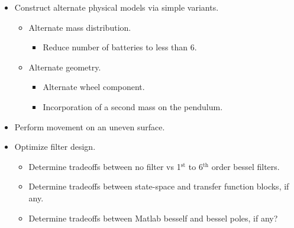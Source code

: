 \documentclass[crop=false,float=true,class=scrreprt]{standalone}
\begin{document}
\begin{itemize}[leftmargin=*]
\clearpage




\item Construct alternate physical models via simple variants.
\begin{itemize}[leftmargin=*, label=$\vcenter{\hbox{\tiny$\bullet$}}$]

  \item Alternate mass distribution.
  \begin{itemize}[leftmargin=*, label=$\cdot$]
  
    \item Reduce number of batteries to less than 6.
  
  \end{itemize}
  
  \item Alternate geometry.
  \begin{itemize}[leftmargin=*, label=$\cdot$]
  
    \item Alternate wheel component.\\
    
    \item Incorporation of a second mass on the pendulum.
  
  \end{itemize}
  
\end{itemize}


\item Perform movement on an uneven surface.


\item Optimize filter design.
\begin{itemize}[leftmargin=*, label=$\vcenter{\hbox{\tiny$\bullet$}}$]

  \item Determine tradeoffs between no filter vs 1$^{\text{st}}$ to 6$^{\text{th}}$ order bessel filters.
  
  \item Determine tradeoffs between state-space and transfer function blocks, if any.
  
  \item Determine tradeoffs between Matlab besself and bessel poles, if any?


\end{itemize}
\end{itemize}
\end{document}
